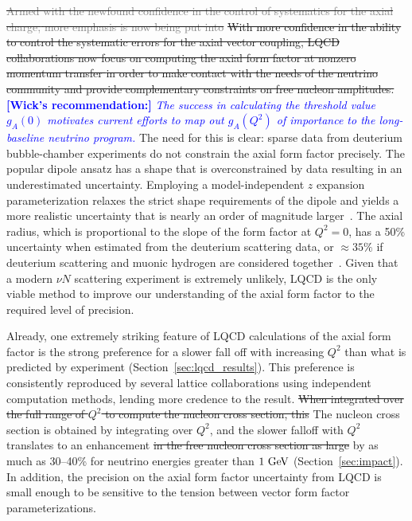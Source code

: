 \documentclass{ar-1col}
\def\asm#1{{\color{blue}#1}}
\def\del#1{}
\def\done#1{{\color{brown}#1}}
\begin{document}
\sout{
 \textcolor{gray}{Armed with the newfound confidence in the control of systematics for the axial charge,}
 \textcolor{gray}{more emphasis is now being put into}}
\sout{
\asm{With more confidence in the ability to control the}
\asm{systematic errors for the axial vector coupling, LQCD collaborations now focus on computing}
 the \done{axial} form factor at nonzero momentum transfer \asm{in order}
 to make contact with the needs of the neutrino community and provide
 complementary constraints on free nucleon amplitudes.
}
{\textcolor{blue}{ {\bf [Wick's recommendation:]}
 \emph{The success in calculating the threshold value $g_A(0)$ motivates current efforts
 to map out $g_A(Q^2)$ of importance to the long-baseline neutrino program.}}}
\asm{The need for this is clear:} \done{sparse data from deuterium bubble-chamber experiments do not constrain
the axial form factor precisely.
The popular dipole ansatz has a shape that
is overconstrained by data resulting in an underestimated uncertainty.
Employing a model-independent $z$ expansion parameterization
relaxes the strict shape requirements of the dipole and yields
a more realistic uncertainty that is nearly an order of magnitude larger~\cite{Meyer:2016oeg}.
The axial radius, which is proportional to the slope of the form factor at $Q^2=0$,
has a 50\% uncertainty when estimated from the deuterium scattering data,
or $\approx35\%$ if deuterium scattering and muonic hydrogen are considered
together~\cite{Hill:2017wgb}.
Given that a modern $\nu N$ scattering experiment is extremely unlikely, LQCD is the only viable method to improve our understanding of the axial form factor to the required level of precision.
}

\done{Already,} one extremely striking feature of LQCD calculations \asm{of the axial form factor}
is the strong preference for a slower fall off \del{of the form factor }with increasing $Q^2$ than \asm{what is predicted by}\del{predicted by phenomenological determinations from} experiment (\done{Section~\ref{sec:lqcd_results}}).
This preference is consistently reproduced by several lattice collaborations using
independent computation methods, lending more credence to the result.
\sout{When integrated over the full range of $Q^2$ to compute the nucleon cross section, this}
\asm{The nucleon cross section is obtained by integrating over $Q^2$, and the slower falloff with $Q^2$}
translates to an enhancement \sout{in the free nucleon cross section as large}
\asm{by as much} as 30--40\%
\del{over}\asm{for} neutrino energies greater than $1~{\rm GeV}$ (Section~\ref{sec:impact}).
In addition, the precision on the axial form factor uncertainty from LQCD
is small enough to be sensitive to the tension between vector form factor parameterizations.
\end{document}
